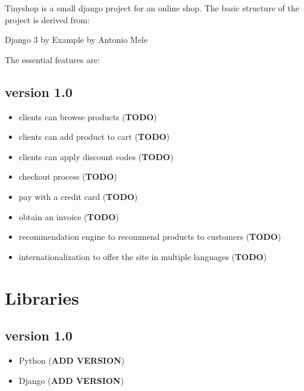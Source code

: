 Tinyshop is a small django project for an online shop. The basic structure of the project is derived from:

Django 3 by Example by Antonio Mele

The essential features are:

\subsection{version 1.0}

\begin{itemize}
	\item clients can browse products (\textbf{TODO})
	\item clients can add product to cart (\textbf{TODO})
	\item clients can apply discount codes (\textbf{TODO})
	\item checkout process (\textbf{TODO})
	\item pay with a credit card (\textbf{TODO})
	\item obtain an invoice (\textbf{TODO})
	\item recommendation engine to recommend products to customers (\textbf{TODO})
	\item internationalization to offer the site in multiple languages (\textbf{TODO})
\end{itemize}

\section{Libraries}

\subsection{version 1.0}

\begin{itemize}
	\item Python (\textbf{ADD VERSION})
	\item Django (\textbf{ADD VERSION})
\end{itemize}
